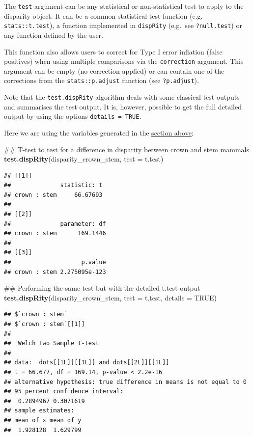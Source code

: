 \documentclass[]{book}
\newenvironment{Shaded}{\begin{snugshade}}{\end{snugshade}}
\newcommand{\KeywordTok}[1]{\textcolor[rgb]{0.13,0.29,0.53}{\textbf{#1}}}
\newcommand{\DataTypeTok}[1]{\textcolor[rgb]{0.13,0.29,0.53}{#1}}
\newcommand{\OtherTok}[1]{\textcolor[rgb]{0.56,0.35,0.01}{#1}}
\newcommand{\NormalTok}[1]{#1}
\theoremstyle{definition}
\theoremstyle{definition}
\theoremstyle{remark}
\begin{document}
The \texttt{test} argument can be any statistical or non-statistical
test to apply to the disparity object. It can be a common statistical
test function (e.g. \texttt{stats::t.test}), a function implemented in
\texttt{dispRity} (e.g.~see \texttt{?null.test}) or any function defined
by the user.

This function also allows users to correct for Type I error inflation
(false positives) when using multiple comparisons via the
\texttt{correction} argument. This argument can be empty (no correction
applied) or can contain one of the corrections from the
\texttt{stats::p.adjust} function (see \texttt{?p.adjust}).

Note that the \texttt{test.dispRity} algorithm deals with some classical
test outputs and summarises the test output. It is, however, possible to
get the full detailed output by using the options
\texttt{details\ =\ TRUE}.

Here we are using the variables generated in the
\protect\hyperlink{summarising-dispRity-data-plots}{section above}:

\begin{Shaded}
\begin{Highlighting}[]
\NormalTok{## T-test to test for a difference in disparity between crown and stem mammals}
\KeywordTok{test.dispRity}\NormalTok{(disparity_crown_stem, }\DataTypeTok{test =}\NormalTok{ t.test)}
\end{Highlighting}
\end{Shaded}

\begin{verbatim}
## [[1]]
##              statistic: t
## crown : stem     66.67693
## 
## [[2]]
##              parameter: df
## crown : stem      169.1446
## 
## [[3]]
##                    p.value
## crown : stem 2.275095e-123
\end{verbatim}

\begin{Shaded}
\begin{Highlighting}[]
\NormalTok{## Performing the same test but with the detailed t.test output}
\KeywordTok{test.dispRity}\NormalTok{(disparity_crown_stem, }\DataTypeTok{test =}\NormalTok{ t.test, }\DataTypeTok{details =} \OtherTok{TRUE}\NormalTok{)}
\end{Highlighting}
\end{Shaded}

\begin{verbatim}
## $`crown : stem`
## $`crown : stem`[[1]]
## 
##  Welch Two Sample t-test
## 
## data:  dots[[1L]][[1L]] and dots[[2L]][[1L]]
## t = 66.677, df = 169.14, p-value < 2.2e-16
## alternative hypothesis: true difference in means is not equal to 0
## 95 percent confidence interval:
##  0.2894967 0.3071619
## sample estimates:
## mean of x mean of y 
##  1.928128  1.629799
\end{verbatim}
\end{document}
